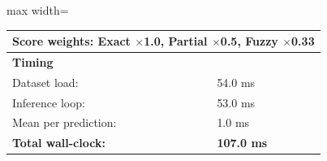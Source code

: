 \begin{table}[htbp]
\begin{adjustbox}{max width=\textwidth}
\begin{tabular}{r p{5cm} r r r r}
\multicolumn{6}{l}{Score weights: Exact $\times$1.0, Partial $\times$0.5, Fuzzy $\times$0.33} \\
\midrule
\multicolumn{6}{l}{\textbf{Timing}} \\
\midrule
\multicolumn{3}{l}{Dataset load:} & \multicolumn{3}{l}{54.0 ms} \\
\multicolumn{3}{l}{Inference loop:} & \multicolumn{3}{l}{53.0 ms} \\
\multicolumn{3}{l}{Mean per prediction:} & \multicolumn{3}{l}{1.0 ms} \\
\multicolumn{3}{l}{\textbf{Total wall-clock:}} & \multicolumn{3}{l}{\textbf{107.0 ms}} \\
\bottomrule
\end{tabular}
\end{adjustbox}
\end{table}
